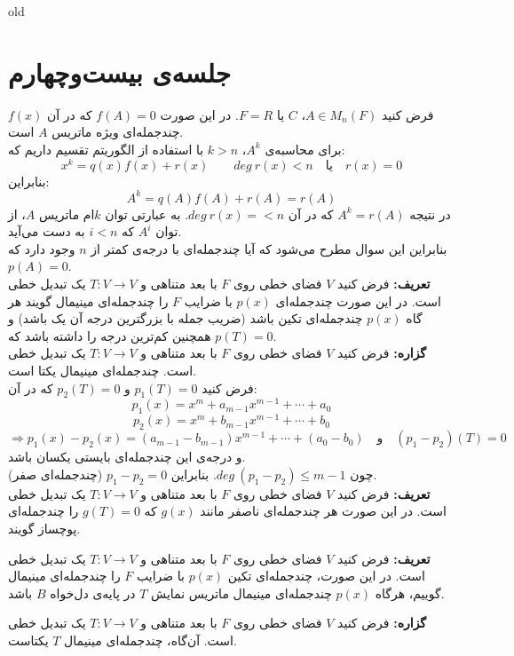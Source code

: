 old
\chapter{جلسه‌ی بیست‌و‌چهارم}

فرض کنید $A\in M_n(F)$، $F = R \text{ یا }C$. در این صورت $f(A) = 0$ که در آن $f(x)$ چند‌جمله‌ای ویژه ماتریس $A$ است.\\
برای محاسبه‌ی $A^k$، $k> n$ با استفاده از الگوریتم تقسیم داریم که:
$$x^k = q(x) f(x) +r(x) \quad\quad deg \: r(x)<n \quad \text{یا} \quad r(x) = 0$$
بنابراین:
$$A^k = q(A)f(A) +r(A)= r(A)$$
در نتیجه $A^k = r(A)$ که در آن $deg\: r(x) =<n$. به عبارتی توان $k$ام ماتریس $A$، از توان $A^i$ که $i<n$ به دست می‌آید. \\
بنابراین این سوال مطرح می‌شود که آیا چند‌جمله‌ای با درجه‌ی کمتر از $n$ وجود دارد که $p(A) = 0$.\\
\textbf{تعریف:} فرض کنید $V$ فضا‌ی خطی روی $F$ با بعد متناهی و $T:V\rightarrow V$ یک تبدیل خطی است. در این صورت چند‌جمله‌ای $p(x)$ با ضرایب $F$ را چند‌جمله‌ای مینیمال گویند هر گاه $p(x)$ چند‌جمله‌ای تکین باشد (ضریب جمله با بزرگترین درجه آن یک باشد) و همچنین کم‌ترین درجه را داشته باشد که $p(T) = 0$.\\
\textbf{گزاره:} فرض کنید $V$ فضا‌ی خطی روی $F$ با بعد متناهی و $T:V\rightarrow V$ یک تبدیل خطی است. چندجمله‌ای مینیمال یکتا است.\\
فرض کنید $p_1(T) = 0$ و $p_2(T)= 0$ که در آن:
$$p_1(x) = x^m + a_{m-1}x^{m-1}+\cdots + a_0$$
$$p_2(x) = x^m + b_{m-1}x^{m-1}+ \cdots+ b_0$$
$$\Rightarrow p_1(x) - p_2(x) = (a_{m-1}-b_{m-1})x^{m-1} + \cdots + (a_0-b_0) \quad \text{و} \quad (p_1-p_2)(T) = 0$$
و درجه‌ی این چند‌جمله‌ای بایستی یکسان باشد.\\
چون $deg\: (p_1-p_2) \leq m-1$. بنابراین $p_1-p_2 = 0 $ (چندجمله‌ای صفر).\\
\textbf{تعریف:} فرض کنید $V$ فضا‌ی خطی روی $F$ با بعد متناهی و $T:V\rightarrow V$ یک تبدیل خطی است. در این صورت هر چندجمله‌ای ناصفر مانند $g(x)$ که $g(T)=0$ را چندجمله‌ای پوچساز گویند.


\textbf{تعریف:} 
فرض کنید $V$ فضای خطی روی $F$ با بعد متناهی و
$T:V\to V$
یک تبدیل خطی است. در این صورت، چندجمله‌ای تکین $p(x)$ با ضرایب $F$ را چندجمله‌ای مینیمال گوییم، هرگاه $p(x)$ چندجمله‌ای مینیمال ماتریس نمایش $T$ در پایه‌ی دل‌خواه $B$ باشد.

\textbf{گزاره:}
فرض کنید $V$  فضای خطی روی $F$ با بعد متناهی و
$T:V\to V$
یک تبدیل خطی است. آن‌گاه، چندجمله‌ای مینیمال $T$ یکتاست.

